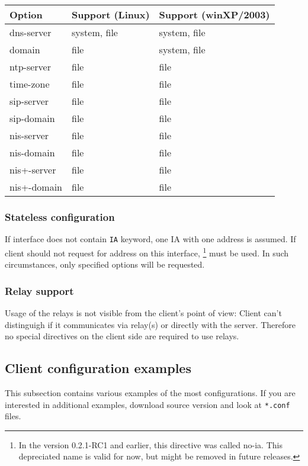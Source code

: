 \begin{center}
\begin{tabular}{|l|l|l|}
\hline
Option & Support (Linux) & Support (winXP/2003)  \\
\hline
dns-server  & system, file & system, file \\
domain      & file         & system, file \\
ntp-server  & file         & file \\
time-zone   & file         & file \\
sip-server  & file         & file \\
sip-domain  & file         & file \\
nis-server  & file         & file \\
nis-domain  & file         & file \\
nis+-server & file         & file \\
nis+-domain & file         & file \\
\hline
\end{tabular}
\end{center}

\subsubsection{Stateless configuration}

If interface does not contain \verb+IA+ keyword, one IA with one address is
assumed. If client should not request for address on this interface,
\footnote{In the version 0.2.1-RC1 and earlier, this
  directive was called no-ia. This depreciated name is valid for now,
  but might be removed in future releases.}
must be used. In such circumstances, only specified options will be
requested.

\subsubsection{Relay support}
Usage of the relays is not visible from the client's point of view:
Client can't distinguigh if it communicates via relay(s) or directly
with the server. Therefore no special directives on the client side 
are required to use relays. 

\subsection{Client configuration examples}
This subsection contains various examples of the most configurations.
If you are interested in additional examples, download source version
and look at \verb+*.conf+ files.

